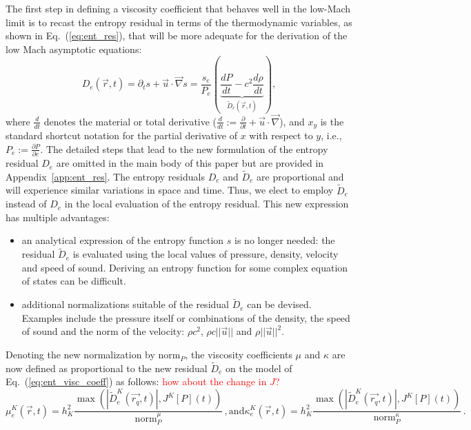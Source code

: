 \documentclass[preprint,10pt]{elsarticle}
\newcommand{\grad}{\vec{\nabla}}
\newcommand{\norm}{\textrm{norm}}
\newcommand{\eqt}[1]{Eq.~(\ref{#1})}                     %
\newcommand{\app}[1]{Appendix~\ref{#1}}                   %
\newcommand{\tcr}[1]{\textcolor{red}{#1}}
\begin{document}
The first step in defining a viscosity coefficient that behaves well in the low-Mach limit is to recast the entropy residual in terms of the thermodynamic variables, as shown in \eqt{eq:ent_res}, that will be more adequate for the derivation of the low Mach asymptotic equations:
%
\begin{equation}
\label{eq:ent_res}
D_e(\vec{r},t) = \partial_t s + \vec{u} \cdot \grad s = \frac{s_e}{P_e} \left( \underbrace{\frac{d P}{dt} - c^2 \frac{d \rho}{dt}}_{\tilde{D}_e(\vec{r},t)} \right),
\end{equation} 
%
where $\frac{d }{dt}$ denotes the material or total derivative ($\frac{d }{dt}:= \frac{\partial}{\partial t} + \vec{u} \cdot \grad$), and $x_y$ is the standard shortcut notation for the partial derivative of $x$ with respect to $y$, i.e., $P_e:=\frac{\partial P}{\partial e}$. The detailed steps that lead to the new formulation of the entropy residual $D_e$ are omitted in the main body of this paper but are provided in \app{app:ent_res}. 
%
The entropy residuals $D_e$ and $\tilde{D}_e$ are proportional and will experience similar variations in space and time. Thus, we elect to employ $\tilde{D}_e$ instead of $D_e$ in the local evaluation of the entropy residual. This new expression has multiple advantages:
%
\begin{itemize}
\item an analytical expression of the entropy function $s$ is no longer needed: the residual $\tilde{D}_e$ is evaluated using the local values of pressure, density, velocity and speed of sound. Deriving an entropy function for some complex equation of states can be difficult.
\item additional normalizations suitable of the residual $\tilde{D}_e$ can be devised. Examples include the pressure itself or combinations of the density, the speed of sound and the norm of the velocity: $\rho c^2$, $\rho c || \vec{u} ||$ and $\rho || \vec{u} ||^2$. 
\end{itemize}
%
Denoting the new normalization by $\norm_P$, the viscosity coefficients $\mu$ and $\kappa$ are now defined as proportional to the new  residual $\tilde{D}_e$ on the model of \eqt{eq:ent_visc_coeff} as follows:
%
\tcr{how about the change in $J$?}
\begin{subequations}
\label{eq:visc_definition}
\begin{equation}
\mu^K_e(\vec{r},t)    = h_K^2 \frac{\max\left( | \tilde{D}^K_e(\vec{r_q},t) |, J^K[P](t) \right)}{\norm_P^\mu}    \, ,
\end{equation} 
\text{and} 
\begin{equation}
\kappa^K_e(\vec{r},t) = h_K^2 \frac{\max\left( | \tilde{D}^K_e(\vec{r_q},t) |, J^K[P](t) \right)}{\norm_P^\kappa} \, .
\end{equation}
\end{subequations}
\end{document}
